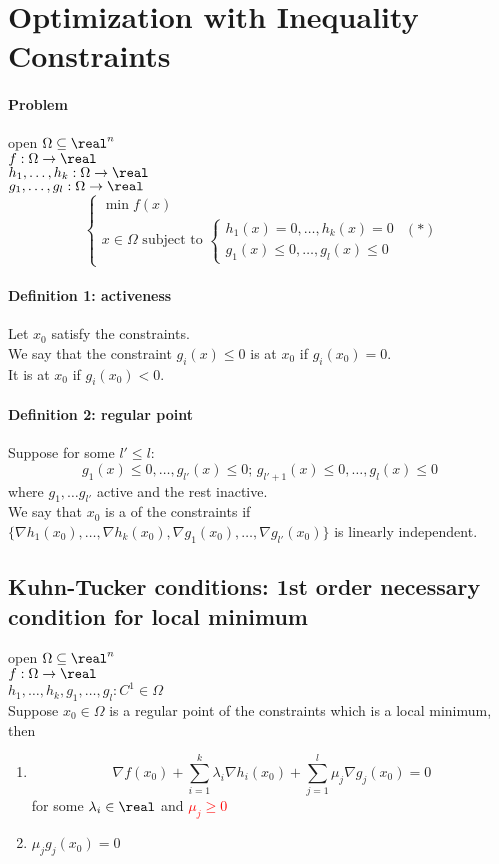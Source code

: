 \documentclass[11pt]{article}
\begin{document}
\section{Optimization with Inequality Constraints}
\paragraph{Problem}
open $\Omega \subseteq \real^n$\\
$f: \Omega \rightarrow \real$ \\
$h_1, \hdots, h_k: \Omega \rightarrow \real$ \\
$g_1, \hdots, g_l: \Omega \rightarrow \real$ \\
$$\begin{cases}
	\min f(x) \\
	x \in \Omega \text{ subject to } 
\begin{cases}
	h_1(x) = 0, \hdots, h_k(x) = 0 \\
	g_1(x) \leq 0, \hdots, g_l(x) \leq 0
\end{cases}
\end{cases}(*)$$

\paragraph{Definition 1: activeness}
Let $x_0$ satisfy the constraints. \\
We say that the constraint $g_i(x) \leq 0$ is  at $x_0$ if $g_i(x_0) = 0$. \\ It is  at $x_0$ if $g_i(x_0) < 0$.\\
\paragraph{Definition 2: regular point}
Suppose for some $l' \leq l$:
$$g_1(x) \leq 0, \hdots, g_{l'}(x) \leq 0; \, g_{l' + 1}(x) \leq 0, \hdots, g_l(x) \leq 0$$
where $g_1, \hdots g_{l'}$ active and the rest inactive. \\
We say that $x_0$ is a  of the constraints if \\
$\{\nabla h_1(x_0), \hdots, \nabla h_k(x_0), \nabla g_1(x_0), \hdots, \nabla g_{l'}(x_0)\}$ is linearly independent.

\subsection{Kuhn-Tucker conditions: 1st order necessary condition for local minimum}
open $\Omega \subseteq \real^n$\\
$f: \Omega \rightarrow \real$ \\
$h_1, \hdots, h_k, g_1, \hdots, g_l: C^1 \in \Omega$ \\
Suppose $x_0 \in \Omega$ is a regular point of the constraints which is a local minimum, then
\begin{enumerate}
	\item $$\nabla f(x_0) + \sum_{i=1}^k \lambda_i \nabla h_i(x_0) + \sum_{j=1}^l \mu_j \nabla g_j(x_0) = 0$$ for some $\lambda_i \in \real$ and \textcolor{red}{$\mu_j \geq 0$}
	\item $\mu_j g_j(x_0) = 0$
\end{enumerate}
\end{document}
